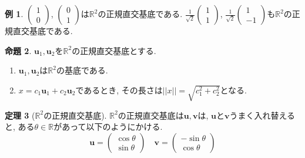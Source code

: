 \documentclass[dvipdfmx,a4paper,11pt]{article}
\newcommand{\R}{\mathbb{R}}
\theoremstyle{definition}
\newtheorem{thm}{定理}
\newtheorem{prop}[thm]{命題}
\newtheorem{exa}[thm]{例}
\begin{document}
 
 \begin{exa}
 $  \begin{pmatrix}
1 \\ 0
 \end{pmatrix}  
 $,
  $  \begin{pmatrix}
0 \\ 1
 \end{pmatrix}  
 $は$\R^2$の正規直交基底である.
 $  \frac{1}{\sqrt{2}}\begin{pmatrix}
1 \\ 1
 \end{pmatrix}  
 $,
  $  \frac{1}{\sqrt{2}}\begin{pmatrix}
1 \\ -1
 \end{pmatrix}  
 $も$\R^2$の正規直交基底である. 
 \end{exa}





   \begin{tcolorbox}[
    colback = white,
    colframe = green!35!black,
    fonttitle = \bfseries,
    breakable = true]
    \begin{prop}
     $\bm{u}_1, \bm{u}_2 $を$\R^2$の正規直交基底とする.
  \begin{enumerate}
  \setlength{\parskip}{0cm}
 \setlength{\itemsep}{0pt} 
\item  $\bm{u}_1, \bm{u}_2 $は$\R^2$の基底である.
\item $x = c_1\bm{u}_1 + c_2\bm{u}_2$であるとき, その長さは$|| x ||=\sqrt{c_{1}^{2} + c_{2}^{2}}$となる. 
  \end{enumerate}
  \end{prop}
 \end{tcolorbox}
 
 
 
 \begin{tcolorbox}[
    colback = white,
    colframe = green!35!black,
    fonttitle = \bfseries,
    breakable = true]
    \begin{thm}[$\R^2$の正規直交基底]
$\R^2$の正規直交基底は$\bm{u},  \bm{v}$は, $\bm{u}$と$\bm{v}$うまく入れ替えると, ある$\theta \in \R$があって以下のようにかける. 
$$
\bm{u}
=
  \begin{pmatrix}
\cos \theta \\ \sin \theta
 \end{pmatrix}  
\quad
\bm{v}
=
\begin{pmatrix}
 -\sin \theta \\ \cos \theta
 \end{pmatrix}  
$$
\end{thm}
 \end{tcolorbox}
 
\end{document}
